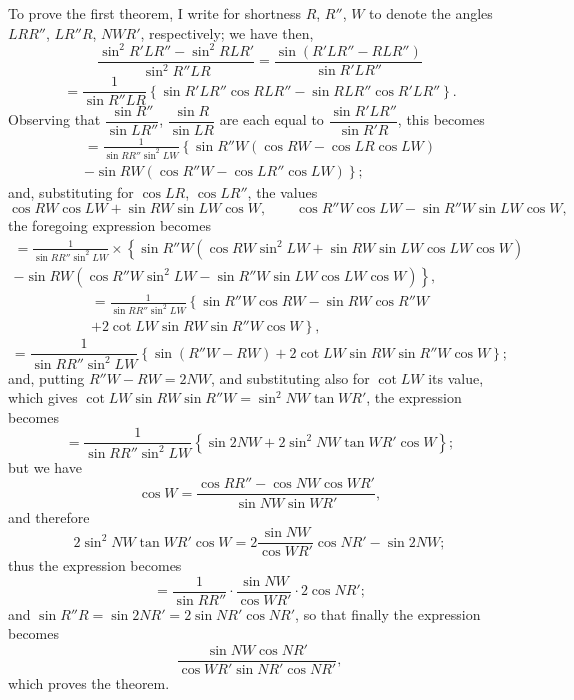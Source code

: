 \documentclass[11pt,a4paper]{book}
\begin{document}
To prove the first theorem, I write for shortness $R$, $R''$, $W$ to denote the angles $LRR''$, $LR''R$, $NWR'$, respectively; we have then,
\[
\frac{\sin^2R'LR''-\sin^2RLR'}{\sin^2R''LR}
=\frac{\sin(R'LR''-RLR'')}{\sin R'LR''}
\]
\[
=\frac{1}{\sin R''LR}\left\{\sin R'LR''\cos RLR''-\sin RLR''\cos R'LR''\right\}.
\]
Observing that $\dfrac{\sin R''}{\sin LR''}$, $\dfrac{\sin R}{\sin LR}$ are each equal to $\dfrac{\sin R'LR''}{\sin R'R}$, this becomes
\begin{multline*}
=\frac{1}{\sin RR''\sin^2LW}
\left\{\sin R''W(\cos RW-\cos LR\cos LW)\right.\\
\left.-\sin RW(\cos R''W-\cos LR''\cos LW)\right\};
\end{multline*}
and, substituting for $\cos LR$, $\cos LR''$, the values
\[
\cos RW\cos LW+\sin RW\sin LW\cos W,\qquad
\cos R''W\cos LW-\sin R''W\sin LW\cos W,
\]
the foregoing expression becomes
\begin{multline*}
=\frac{1}{\sin RR''\sin^2LW}
\times\left\{\sin R''W(\cos RW\sin^2LW+\sin RW\sin LW\cos LW\cos W)\right.\\
\left.-\sin RW(\cos R''W\sin^2LW-\sin R''W\sin LW\cos LW\cos W)\right\},
\end{multline*}
\begin{multline*}
=\frac{1}{\sin RR''\sin^2LW}
\left\{\sin R''W\cos RW-\sin RW\cos R''W\right.\\
\left.+2\cot LW\sin RW\sin R''W\cos W\right\},
\end{multline*}
\[
=\frac{1}{\sin RR''\sin^2LW}
\left\{\sin(R''W-RW)+2\cot LW\sin RW\sin R''W\cos W\right\};
\]
and, putting $R''W-RW=2NW$, and substituting also for $\cot LW$ its value, which gives $\cot LW\sin RW\sin R''W=\sin^2NW\tan WR'$, the expression becomes
\[
=\frac{1}{\sin RR''\sin^2LW}
\left\{\sin 2NW+2\sin^2NW\tan WR'\cos W\right\};
\]
but we have
\[
\cos W=\frac{\cos RR''-\cos NW\cos WR'}{\sin NW\sin WR'},
\]
and therefore
\[
2\sin^2NW\tan WR'\cos W=2\frac{\sin NW}{\cos WR'}\cos NR'-\sin 2NW;
\]
thus the expression becomes
\[
=\frac{1}{\sin RR''}\cdot\frac{\sin NW}{\cos WR'}\cdot2\cos NR';
\]
and $\sin R''R=\sin 2NR'=2\sin NR'\cos NR'$, so that finally the expression becomes
\[
\frac{\sin NW\cos NR'}{\cos WR'\sin NR'\cos NR'},
\]
which proves the theorem.
\end{document}
